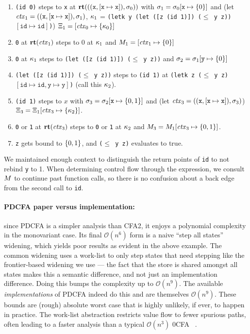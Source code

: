 \documentclass{llncs}
\begin{document}
\begin{enumerate}
\item{\texttt{(id 0)} steps to \texttt{x} at $\mathbf{rt}(((\texttt{x}, [\texttt{x}\mapsto\texttt{x}]), \sigma_0))$ with $\sigma_1 =
    \sigma_0[\texttt{x} \mapsto \{ 0 \}]$ and
    (let $\mathit{ctx}_1 = ((\texttt{x},[\texttt{x}\mapsto\texttt{x}]),\sigma_1)$,
         $\kappa_1$ = \texttt{(letk y (let ([z (id 1)]) ($\le$ y z)) $[\texttt{id}\mapsto{\texttt{id}}]$)})
    $\Xi_1 = [\mathit{ctx}_0 \mapsto \{ \kappa_0 \}]$}
\item{\texttt{0} at $\mathbf{rt}(\mathit{ctx}_1)$ steps to $0$ at $\kappa_1$ and $M_1 = [\mathit{ctx}_1 \mapsto \{ 0 \}]$}
\item{\texttt{0} at $\kappa_1$ steps to \texttt{(let ([z (id 1)]) ($\le$ y z))} and $\sigma_2 = \sigma_1[\texttt{y} \mapsto \{ 0 \}]$}
\item{\texttt{(let ([z (id 1)]) ($\le$ y z))} steps to \texttt{(id 1)} at \texttt{(letk z ($\le$ y z) $[\texttt{id} \mapsto \texttt{id}, \texttt{y} \mapsto \texttt{y}]$)} (call this $\kappa_2$).}
\item{\texttt{(id 1)} steps to $x$ with $\sigma_3 = \sigma_2[\texttt{x} \mapsto \{ 0,1 \}]$ and
      (let $\mathit{ctx}_3 = ((\texttt{x},[\texttt{x}\mapsto\texttt{x}]),\sigma_3)$) $\Xi_3 =\Xi_1[\mathit{ctx}_3 \mapsto \{ \kappa_2 \}]$.}
\item{\texttt{0} or \texttt{1} at $\mathbf{rt}(\mathit{ctx}_3)$ steps to \texttt{0} or \texttt{1} at $\kappa_2$ and $M_3 = M_1[\mathit{ctx}_3 \mapsto \{ 0,1 \}]$.}
\item{\texttt{z} gets bound to $\{ 0,1 \}$, and \texttt{($\le$ y z)} evaluates to true.}
\end{enumerate}

We maintained enough context to distinguish the return points of
\texttt{id} to not rebind \texttt{y} to 1. When determining control
flow through the expression, we consult $M$ to continue past
function calls, so there is no confusion about a back edge from the
second call to \texttt{id}.

\paragraph{PDCFA paper versus implementation:} since PDCFA is a
simpler analysis than CFA2, it enjoys a polynomial complexity in the
monovariant case. Its final ${\mathcal O}(n^6)$ form is a naive ``step
all states'' widening, which yields poor results as evident in the
above example. The common widening uses a work-list to only step
states that need stepping like the frontier-based widening we use ---
the fact that the store is shared amongst all states makes this a
semantic difference, and not just an implementation difference. Doing
this bumps the complexity up to ${\mathcal O}(n^9)$. The available
\emph{implementations} of PDCFA indeed do this and are themselves
${\mathcal O}(n^9)$. These bounds are (rough) absolute worst case that
is highly unlikely, if ever, to happen in practice. The work-list
abstraction restricts value flow to fewer spurious paths, often
leading to a faster analysis than a typical ${\mathcal O}(n^3)$ 0CFA
~\citep{ianjohnson:vardoulakis-lmcs11,
  dvanhorn:Earl2012Introspective}.
\end{document}
